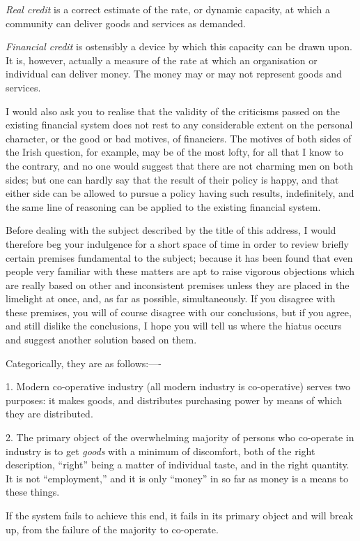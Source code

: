 \documentclass{book}
\begin{document}
\emph{Real credit} is a correct estimate of the rate, or dynamic capacity, at which a community can deliver goods and services as demanded.

\emph{Financial credit} is ostensibly a device by which this capacity can be drawn upon. It is, however, actually a measure of the rate at which an organisation or individual can deliver money. The money may or may not represent goods and services.

I would also ask you to realise that the validity of the criticisms passed on the existing financial system does not rest to any considerable extent on the personal character, or the good or bad motives, of financiers. The motives of both sides of the Irish question, for example, may be of the most lofty, for all that I know to the contrary, and no one would suggest that there are not charming men on both sides; but one can hardly say that the result of their policy is happy, and that either side can be allowed to pursue a policy having such results, indefinitely, and the same line of reasoning can be applied to the existing financial system.

Before dealing with the subject described by the title of this address, I would therefore beg your indulgence for a short space of time in order to review briefly certain premises fundamental to the subject; because it has been found that even people very familiar with these matters are apt to raise vigorous objections which are really based on other and inconsistent premises unless they are placed in the limelight at once, and, as far as possible, simultaneously. If you disagree with these premises, you will of course disagree with our conclusions, but if you agree, and still dislike the conclusions, I hope you will tell us where the hiatus occurs and suggest another solution based on them.

Categorically, they are as follows:—-

1. Modern co-operative industry (all modern industry is co-operative) serves two purposes: it makes goods, and distributes purchasing power by means of which they are distributed.

2. The primary object of the overwhelming majority of persons who co-operate in industry is to get \emph{goods} with a minimum of discomfort, both of the right description, “right” being a matter of individual taste, and in the right quantity. It is not “employment,” and it is only “money” in so far as money is a means to these things.

If the system fails to achieve this end, it fails in its primary object and will break up, from the failure of the majority to co-operate.
\end{document}
